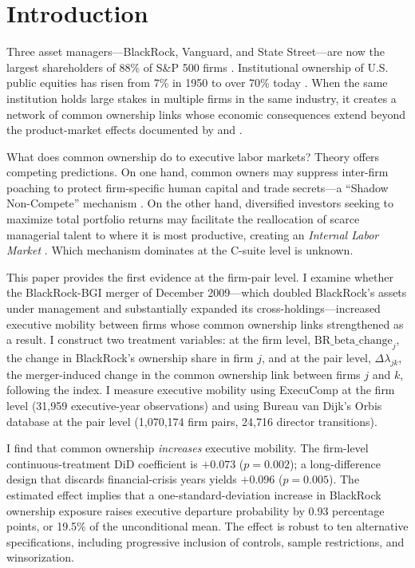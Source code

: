 \documentclass[11pt,a4paper]{article}
\begin{document}
\newpage

\section{Introduction}

Three asset managers---BlackRock, Vanguard, and State Street---are now the largest shareholders of 88\% of S\&P 500 firms \cite{fichnter2016}. Institutional ownership of U.S. public equities has risen from 7\% in 1950 to over 70\% today \cite{gompers2001}. When the same institution holds large stakes in multiple firms in the same industry, it creates a network of common ownership links whose economic consequences extend beyond the product-market effects documented by \cite{azar2018} and \cite{backus2021}.

What does common ownership do to executive labor markets? Theory offers competing predictions. On one hand, common owners may suppress inter-firm poaching to protect firm-specific human capital and trade secrets---a ``Shadow Non-Compete'' mechanism \cite{anton2018}. On the other hand, diversified investors seeking to maximize total portfolio returns may facilitate the reallocation of scarce managerial talent to where it is most productive, creating an \textit{Internal Labor Market} \cite{tate2015,tate2024}. Which mechanism dominates at the C-suite level is unknown.

This paper provides the first evidence at the firm-pair level. I examine whether the BlackRock-BGI merger of December 2009---which doubled BlackRock's assets under management and substantially expanded its cross-holdings---increased executive mobility between firms whose common ownership links strengthened as a result. I construct two treatment variables: at the firm level, $\text{BR\_beta\_change}_j$, the change in BlackRock's ownership share in firm $j$, and at the pair level, $\Delta\lambda_{jk}$, the merger-induced change in the common ownership link between firms $j$ and $k$, following the \cite{azar2018} index. I measure executive mobility using ExecuComp at the firm level (31,959 executive-year observations) and using Bureau van Dijk's Orbis database at the pair level (1,070,174 firm pairs, 24,716 director transitions).

I find that common ownership \textit{increases} executive mobility. The firm-level continuous-treatment DiD coefficient is $+0.073$ ($p=0.002$); a long-difference design that discards financial-crisis years yields $+0.096$ ($p=0.005$). The estimated effect implies that a one-standard-deviation increase in BlackRock ownership exposure raises executive departure probability by 0.93 percentage points, or 19.5\% of the unconditional mean. The effect is robust to ten alternative specifications, including progressive inclusion of controls, sample restrictions, and winsorization.
\end{document}
